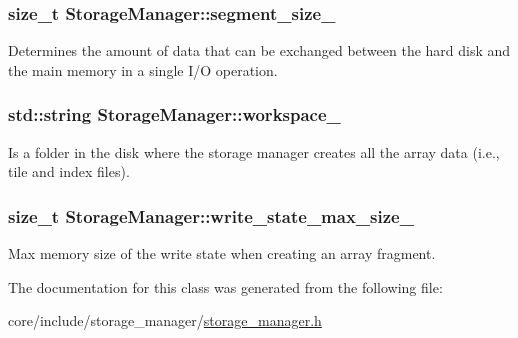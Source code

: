 \subsubsection[{segment\+\_\+size\+\_\+}]{\setlength{\rightskip}{0pt plus 5cm}size\+\_\+t Storage\+Manager\+::segment\+\_\+size\+\_\+\hspace{0.3cm}{\ttfamily [private]}}\label{classStorageManager_ac1fa2414c2d99753a416eaa3e2794fdd}
Determines the amount of data that can be exchanged between the hard disk and the main memory in a single I/\+O operation. \hypertarget{classStorageManager_a3ab615f83f9697bbd2dd4f9fbb79f81f}{}
\subsubsection[{workspace\+\_\+}]{\setlength{\rightskip}{0pt plus 5cm}std\+::string Storage\+Manager\+::workspace\+\_\+\hspace{0.3cm}{\ttfamily [private]}}\label{classStorageManager_a3ab615f83f9697bbd2dd4f9fbb79f81f}
Is a folder in the disk where the storage manager creates all the array data (i.\+e., tile and index files). \hypertarget{classStorageManager_a70f86db65bc93b86d3bbcf46de12d4f3}{}
\subsubsection[{write\+\_\+state\+\_\+max\+\_\+size\+\_\+}]{\setlength{\rightskip}{0pt plus 5cm}size\+\_\+t Storage\+Manager\+::write\+\_\+state\+\_\+max\+\_\+size\+\_\+\hspace{0.3cm}{\ttfamily [private]}}\label{classStorageManager_a70f86db65bc93b86d3bbcf46de12d4f3}
Max memory size of the write state when creating an array fragment. 

The documentation for this class was generated from the following file\+:\begin{DoxyCompactItemize}
\item 
core/include/storage\+\_\+manager/\hyperlink{storage__manager_8h}{storage\+\_\+manager.\+h}\end{DoxyCompactItemize}
